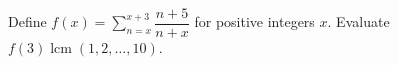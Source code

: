 Define $f(x)=\sum_{n=x}^{x+3}\dfrac{n+5}{n+x}$ for positive integers $x$. Evaluate $f(3)\operatorname{lcm}(1,2,\ldots,10)$.
